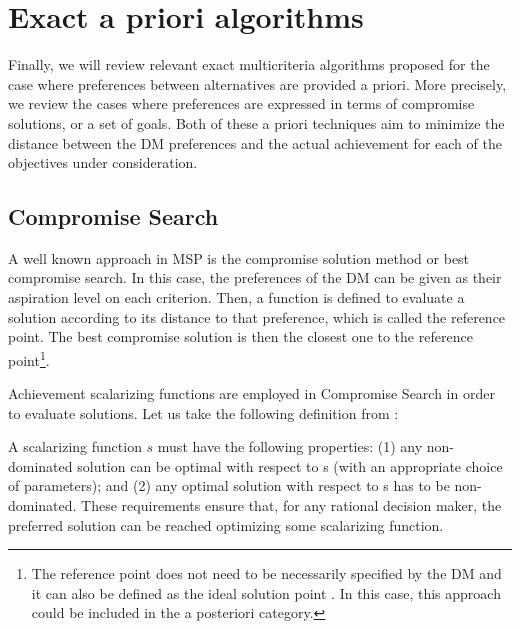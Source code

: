 \section{Exact a priori algorithms}
\label{chapMultiObjAlg:sec:a-priori}

Finally, we will review relevant exact multicriteria algorithms proposed for the case where preferences between alternatives are provided a priori. More precisely, we review the cases where preferences are expressed in terms of compromise solutions, or a set of goals. Both of these a priori techniques aim to minimize the distance between the DM preferences and the actual achievement for each of the objectives under consideration.

\subsection{Compromise Search}
\label{chapMultiObjAlg:subsec:compromise}

A well known approach in MSP is the compromise solution method \citep{Yu1985} or best compromise search. In this case, the preferences of the DM can be given as their aspiration level on each criterion. Then, a function is defined to evaluate a solution according to its distance to that preference, which is called the reference point. The best compromise solution is then the closest one to the reference point\footnote{The reference point does not need to be necessarily specified by the DM and it can also be defined as the ideal solution point \citep{Zeleny1982}. In this case, this approach could be included in the a posteriori category.}.

Achievement scalarizing functions are employed in Compromise Search in order to evaluate solutions. Let us take the following definition from \citep{Machuca2013}: 

\begin{defi}\label{def:scalarizing-function}
A scalarizing function $s$ must have the following properties: (1) any non-dominated solution can be optimal with respect to s (with an appropriate choice of parameters); and (2) any optimal solution with respect to s has to be non-dominated. These requirements ensure that, for any rational decision maker, the preferred solution can be reached optimizing some scalarizing function. 
\end{defi}

